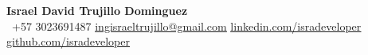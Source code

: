 \begin{center}
    \textbf{\Huge Israel David Trujillo Dominguez} \\ \vspace{10pt}
     \ \small +57 3023691487 \quad
    \href{mailto:ingisraeltrujillo@gmail.com}{ \underline{ingisraeltrujillo@gmail.com}} \quad
    \href{https://www.linkedin.com/in/isradeveloper}{ \underline{linkedin.com/isradeveloper}} \quad
    \href{https://github.com/isradeveloper}{ \underline{github.com/isradeveloper}}
\end{center}